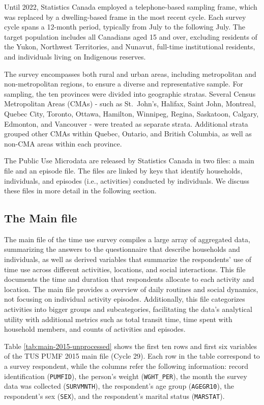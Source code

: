 \documentclass[Royal,times,sageh]{sagej}
\begin{document}
Until 2022, Statistics Canada employed a telephone-based sampling frame,
which was replaced by a dwelling-based frame in the most recent cycle.
Each survey cycle spans a 12-month period, typically from July to the
following July. The target population includes all Canadians aged 15 and
over, excluding residents of the Yukon, Northwest Territories, and
Nunavut, full-time institutional residents, and individuals living on
Indigenous reserves.

The survey encompasses both rural and urban areas, including
metropolitan and non-metropolitan regions, to ensure a diverse and
representative sample. For sampling, the ten provinces were divided into
geographic stratas. Several Census Metropolitan Areas (CMAs) - such as
St.~John's, Halifax, Saint John, Montreal, Quebec City, Toronto, Ottawa,
Hamilton, Winnipeg, Regina, Saskatoon, Calgary, Edmonton, and Vancouver
- were treated as separate strata. Additional strata grouped other CMAs
within Quebec, Ontario, and British Columbia, as well as non-CMA areas
within each province.

The Public Use Microdata are released by Statistics Canada in two files:
a main file and an episode file. The files are linked by keys that
identify households, individuals, and episodes (i.e., activities)
conducted by individuals. We discuss these files in more detail in the
following section.

\subsection{The Main file}\label{the-main-file}

The main file of the time use survey compiles a large array of
aggregated data, summarizing the answers to the questionnaire that
describe households and individuals, as well as derived variables that
summarize the respondents' use of time use across different activities,
locations, and social interactions. This file documents the time and
duration that respondents allocate to each activity and location. The
main file provides a overview of daily routines and social dynamics, not
focusing on individual activity episodes. Additionally, this file
categorizes activities into bigger groups and subcategories,
facilitating the data's analytical utility with additional metrics such
as total transit time, time spent with household members, and counts of
activities and episodes.

Table \ref{tab:main-2015-unprocessed} shows the first ten rows and first
six variables of the TUS PUMF 2015 main file (Cycle 29). Each row in the
table correspond to a survey respondent, while the columns refer the
following information: record identification (\texttt{PUMFID}), the
person's weight (\texttt{WGHT\_PER}), the month the survey data was
collected (\texttt{SURVMNTH}), the respondent's age group
(\texttt{AGEGR10}), the respondent's sex (\texttt{SEX}), and the
respondent's marital status (\texttt{MARSTAT}).
\end{document}
